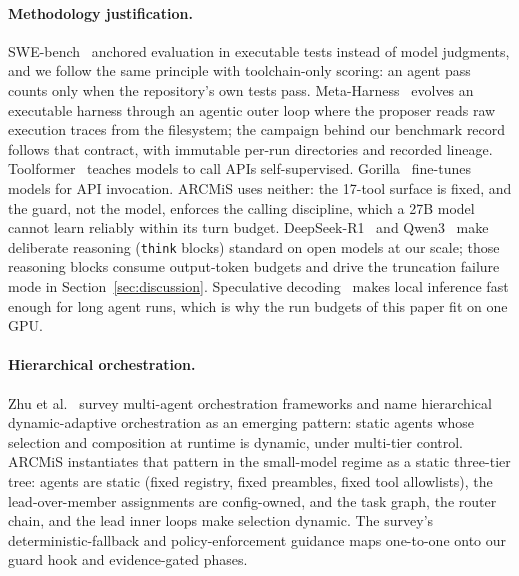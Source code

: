 \documentclass[11pt]{article}
\begin{document}
\paragraph{Methodology justification.}
SWE-bench~\cite{jimenez2024swebench} anchored evaluation in executable
tests instead of model judgments, and we follow the same principle with
toolchain-only scoring: an agent pass counts only when the repository's
own tests pass. Meta-Harness~\cite{metaharness2026} evolves an executable harness
through an agentic outer loop where the proposer reads raw execution
traces from the filesystem; the campaign behind our benchmark
record follows that contract, with immutable per-run directories and
recorded lineage. Toolformer~\cite{schick2023toolformer} teaches
models to call APIs self-supervised. Gorilla~\cite{patil2024gorilla}
fine-tunes models for API invocation. ARCMiS uses neither: the 17-tool
surface is fixed, and the guard, not the model, enforces the calling
discipline, which a 27B model cannot learn reliably within its turn
budget. DeepSeek-R1~\cite{deepseek2025r1}
and Qwen3~\cite{qwen3_2025} make deliberate reasoning (\texttt{think}
blocks) standard on open models at our scale; those reasoning blocks
consume output-token budgets and drive the truncation failure mode in
Section~\ref{sec:discussion}. Speculative
decoding~\cite{leviathan2023speculative} makes local inference fast
enough for long agent runs, which is why the run budgets of this paper
fit on one GPU.

\paragraph{Hierarchical orchestration.}
Zhu et al.~\cite{zhu2026orchestration} survey multi-agent orchestration
frameworks and name hierarchical dynamic-adaptive orchestration as an
emerging pattern: static agents whose selection and composition at
runtime is dynamic, under multi-tier control. ARCMiS instantiates that
pattern in the small-model regime as a static three-tier tree: agents
are static (fixed registry, fixed preambles, fixed tool allowlists), the
lead-over-member assignments are config-owned, and the task graph, the
router chain, and the lead inner loops make selection dynamic. The
survey's deterministic-fallback and policy-enforcement guidance maps
one-to-one onto our guard hook and evidence-gated phases.
\end{document}
